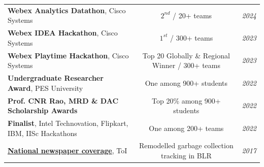 \documentclass[letterpaper, 11pt]{article}
\begin{document}
	\begin{tabular*}{\textwidth}{l@{\extracolsep{\fill}}cr}
		\textbf{Webex Analytics Datathon}, Cisco Systems                                                                                                                                  & $2^{nd}$ / 20+ teams                            & \textit{2024} \\
		\textbf{Webex IDEA Hackathon}, Cisco Systems                                                                                                                                      & $1^{st}$ / 300+ teams                           & \textit{2023} \\
		\textbf{Webex Playtime Hackathon}, Cisco Systems                                                                                                                                  & Top 20 Globally \& Regional Winner / 300+ teams & \textit{2023} \\
		\textbf{Undergraduate Researcher Award}, PES University                                                                                                                           & One among 900+ students                         & \textit{2022} \\
		\textbf{Prof. CNR Rao, MRD \& DAC Scholarship Awards}                                                                                                                             & Top 20\% among 900+ students                    & \textit{2022} \\
		\textbf{Finalist}, Intel Technovation, Flipkart, IBM, IISc Hackathons                                                                                                             & One among 200+ teams                            & \textit{2022} \\
		\textbf{\href{http://bangaloremirror.indiatimes.com/bangalore/others/these-12th-graders-want-app-solutely-no-garbage/articleshow/57619336.cms}{National newspaper coverage}}, ToI & Remodelled garbage collection tracking in BLR   & \textit{2017} \\
	\end{tabular*}

\end{document}
